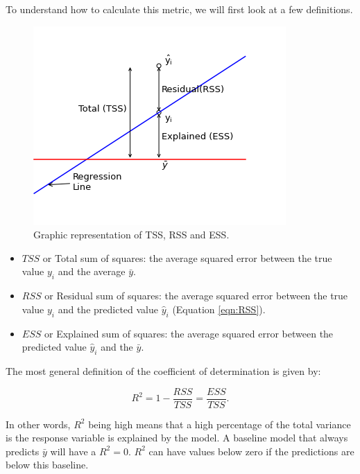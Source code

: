 To understand how to calculate this metric, we will first look at a few definitions.
\begin{figure}
\begin{center}
\vspace{-1cm}
\includegraphics[scale=0.75]{Images/Methods/Correlation/R2_Plot.png}
\caption{\centering Graphic representation of TSS, RSS and ESS.}

\vspace{-1cm}
\end{center}
\end{figure}
\begin{itemize}
  \item $TSS$ or Total sum of squares: the average squared error between the true value $y_{i}$ and the average $\bar y$.
  \item $RSS$ or Residual sum of squares: the average squared error between the true value $y_{i}$ and the predicted value $\hat y_{i}$ (Equation \ref{eqn:RSS}).
  \item $ESS$ or Explained sum of squares: the average squared error between the predicted value $\hat y_{i}$ and the $\bar y$.
\end{itemize}


The most general definition of the coefficient of determination is given by:

\begin{equation}
R^{2} = 1 - \frac{RSS}{TSS} = \frac{ESS}{TSS}.
\end{equation}

In other words, $R^{2}$ being high means that a high percentage of the total variance is the response variable is explained by the model. A baseline model that always predicts $\bar y$ will have a $R^{2}=0$. $R^{2}$ can have values below zero if the predictions are below this baseline.

